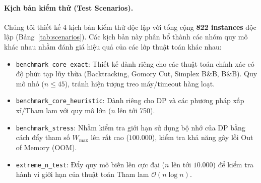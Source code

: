 \documentclass[fontsize=13pt,a4paper]{report}
\begin{document}
\paragraph{Kịch bản kiểm thử (Test Scenarios).} Chúng tôi thiết kế 4 kịch bản kiểm thử độc lập với tổng cộng \textbf{822 instances} độc lập (Bảng~\ref{tab:scenarios}). Các kịch bản này phân bổ thành các nhóm quy mô khác nhau nhằm đánh giá hiệu quả của các lớp thuật toán khác nhau:
\begin{itemize}[leftmargin=*]
    \item \texttt{benchmark\_core\_exact}: Thiết kế dành riêng cho các thuật toán chính xác có độ phức tạp lũy thừa (Backtracking, Gomory Cut, Simplex B\&B, B\&B). Quy mô nhỏ ($n \le 45$), tránh hiện tượng treo máy/timeout hàng loạt.
    \item \texttt{benchmark\_core\_heuristic}: Dành riêng cho DP và các phương pháp xấp xỉ/Tham lam với quy mô lớn ($n$ lên tới 750).
    \item \texttt{benchmark\_stress}: Nhằm kiểm tra giới hạn sử dụng bộ nhớ của DP bằng cách đẩy tham số $W_{\text{max}}$ lên rất cao ($100.000$), kiểm tra khả năng gây lỗi Out of Memory (OOM).
    \item \texttt{extreme\_n\_test}: Đẩy quy mô biến lên cực đại ($n$ lên tới $10.000$) để kiểm tra hành vi giới hạn của thuật toán Tham lam $\mathcal{O}(n \log n)$.
\end{itemize}

\begin{table}[H]
\centering
\caption{Cấu hình chi tiết của 4 kịch bản kiểm thử trong bộ benchmark.}
\label{tab:scenarios}
\end{table}
\end{document}

